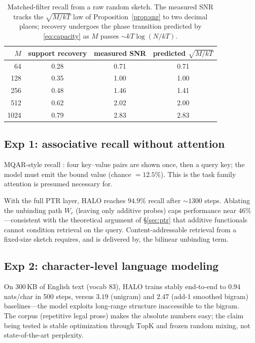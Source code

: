 \documentclass[11pt]{article}
\newcommand{\topk}{\mathrm{TopK}}
\begin{document}
\begin{table}[h]
\centering
\small
\begin{tabular}{rccc}
\toprule
$M$ & support recovery & measured SNR & predicted $\sqrt{M/kT}$ \\
\midrule
64   & 0.28 & 0.71 & 0.71 \\
128  & 0.35 & 1.00 & 1.00 \\
256  & 0.48 & 1.46 & 1.41 \\
512  & 0.62 & 2.02 & 2.00 \\
1024 & 0.79 & 2.83 & 2.83 \\
\bottomrule
\end{tabular}
\caption{Matched-filter recall from a raw random sketch. The measured SNR tracks the $\sqrt{M/kT}$ law of Proposition~\ref{prop:snr} to two decimal places; recovery undergoes the phase transition predicted by \eqref{eq:capacity} as $M$ passes ${\sim}kT\log(N/kT)$.}
\label{tab:exp0}
\end{table}

\subsection{Exp 1: associative recall without attention}
\label{sec:recall}

MQAR-style recall \citep{arora2023zoology}: four key--value pairs are shown once, then a query key; the model must emit the bound value (chance $= 12.5\%$). This is the task family attention is presumed necessary for.

With the full PTR layer, HALO reaches $\mathbf{94.9\%}$ recall after ${\sim}1300$ steps. Ablating the unbinding path $W_c$ (leaving only additive probes) caps performance near $46\%$---consistent with the theoretical argument of \S\ref{sec:ptr} that additive functionals cannot condition retrieval on the query. Content-addressable retrieval from a fixed-size sketch requires, and is delivered by, the bilinear unbinding term.

\subsection{Exp 2: character-level language modeling}

On 300\,KB of English text (vocab 83), HALO trains stably end-to-end to $\mathbf{0.94}$ nats/char in 500 steps, versus $3.19$ (unigram) and $2.47$ (add-1 smoothed bigram) baselines---the model exploits long-range structure inaccessible to the bigram. The corpus (repetitive legal prose) makes the absolute numbers easy; the claim being tested is stable optimization through $\topk$ and frozen random mixing, not state-of-the-art perplexity.
\end{document}
